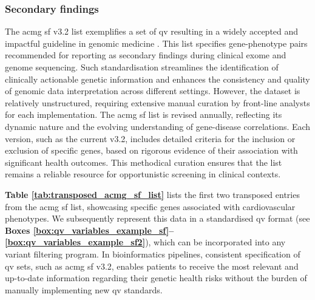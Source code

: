 \subsubsection{Secondary findings}
\label{sec:sf}
The \ac{acmg} \ac{sf} v3.2 list exemplifies a set  of \ac{qv} resulting in a widely accepted and impactful  guideline in genomic medicine \cite{miller2023acmg}. This list specifies gene-phenotype pairs recommended for reporting as secondary findings during clinical exome and genome sequencing. Such standardisation streamlines the identification of clinically actionable genetic information and enhances the consistency and quality of genomic data interpretation across different settings. However, the dataset is relatively unstructured, requiring extensive manual curation by front-line analysts for each implementation. The \ac{acmg} \ac{sf} list is revised annually, reflecting its dynamic nature and the evolving understanding of gene-disease correlations. Each version, such as the current v3.2, includes detailed criteria for the inclusion or exclusion of specific genes, based on rigorous evidence of their association with significant health outcomes. This methodical curation ensures that the list remains a reliable resource for opportunistic screening in clinical contexts.

\textbf{Table \ref{tab:transposed_acmg_sf_list}} lists the first two transposed entries from the \ac{acmg} \ac{sf} list, showcasing specific genes associated with cardiovascular phenotypes. We subsequently represent this data in a standardised \ac{qv} format (see \textbf{Boxes \ref{box:qv_variables_example_sf}–\ref{box:qv_variables_example_sf2}}), which can be incorporated into any variant filtering program. In bioinformatics pipelines, consistent specification of \ac{qv} sets, such as \ac{acmg} \ac{sf} v3.2, enables patients to receive the most relevant and up-to-date information regarding their genetic health risks without the burden of manually implementing new \ac{qv} standards.

